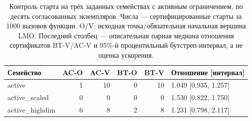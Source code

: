 \begin{table}[htbp]
\centering\small
\caption{Контроль старта на трёх заданных семействах с активным ограничением, по десять согласованных экземпляров. Числа — сертифицированные старты за 1000 вызовов функции. O/V: исходная точка/обязательная начальная вершина LMO. Последний столбец — описательная парная медиана отношения сертификатов BT-V/AC-V и 95\%-й процентильный бутстреп-интервал, а не оценка ускорения.}
\label{tab:init}
\begin{tabular}{lrrrrl}
\toprule
Семейство & AC-O & AC-V & BT-O & BT-V & Отношение [интервал] \\
\midrule
active & 1 & 10 & 0 & 10 & 1.049 [0.935, 1.257] \\
active\_scaled & 0 & 0 & 0 & 0 & 1.530 [0.822, 1.750] \\
active\_highdim & 6 & 8 & 2 & 8 & 1.231 [0.798, 2.117] \\
\bottomrule
\end{tabular}
\end{table}
